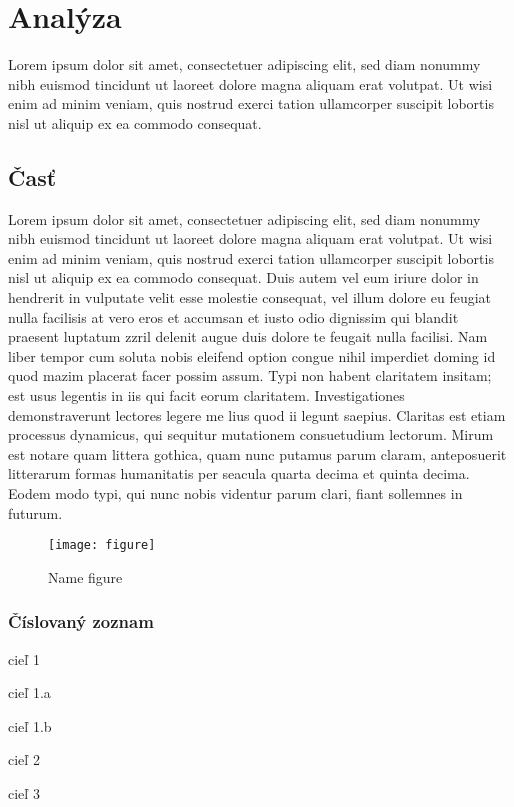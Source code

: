 \newpage
\chapter{Analýza}
\label{ch:Analýza}
Lorem ipsum dolor sit amet, consectetuer adipiscing elit, sed diam nonummy nibh euismod tincidunt ut laoreet dolore magna aliquam erat volutpat. Ut wisi enim ad minim veniam, quis nostrud exerci tation ullamcorper suscipit lobortis nisl ut aliquip ex ea commodo consequat. 

\section{Časť}
\label{sec:Časť}
Lorem ipsum dolor sit amet, consectetuer adipiscing elit, sed diam nonummy nibh euismod tincidunt ut laoreet dolore magna aliquam erat volutpat. Ut wisi enim ad minim veniam, quis nostrud exerci tation ullamcorper suscipit lobortis nisl ut aliquip ex ea commodo consequat. Duis autem vel eum iriure dolor in hendrerit in vulputate velit esse molestie consequat, vel illum dolore eu feugiat nulla facilisis at vero eros et accumsan et iusto odio dignissim qui blandit praesent luptatum zzril delenit augue duis dolore te feugait nulla facilisi. Nam liber tempor cum soluta nobis eleifend option congue nihil imperdiet doming id quod mazim placerat facer possim assum. Typi non habent claritatem insitam; est usus legentis in iis qui facit eorum claritatem. Investigationes demonstraverunt lectores legere me lius quod ii legunt saepius. Claritas est etiam processus dynamicus, qui sequitur mutationem consuetudium lectorum. Mirum est notare quam littera gothica, quam nunc putamus parum claram, anteposuerit litterarum formas humanitatis per seacula quarta decima et quinta decima. Eodem modo typi, qui nunc nobis videntur parum clari, fiant sollemnes in futurum.
\begin{figure}[H]
\begin{center}\texttt{[image: figure]}\end{center}
\caption[Name figure]{Name figure}\label{fig:figure}
\end{figure}

\subsection{Číslovaný zoznam}
\begin{my_enumerate}
	\item {cieľ 1}
	\begin{my_enumerate}
		\item {cieľ 1.a}
		\item {cieľ 1.b}
	\end{my_enumerate}
	\item {cieľ 2}
	\item {cieľ 3}
\end{my_enumerate}
